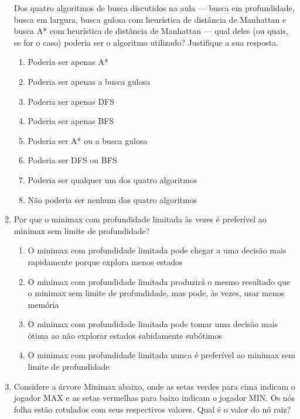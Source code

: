 \documentclass[a4paper,12pt]{article}
\begin{document}
\begin{enumerate}
Dos quatro algoritmos de busca discutidos na aula — busca em profundidade, busca em largura, busca gulosa com heurística de distância de Manhattan e busca A* com heurística de distância de Manhattan — qual deles (ou quais, se for o caso) poderia ser o algoritmo utilizado? Justifique a sua resposta.

\begin{enumerate}
    \item Poderia ser apenas A*
    \item Poderia ser apenas a busca gulosa
    \item Poderia ser apenas DFS
    \item Poderia ser apenas BFS
    \item Poderia ser A* ou a busca gulosa
    \item Poderia ser DFS ou BFS
    \item Poderia ser qualquer um dos quatro algoritmos
    \item Não poderia ser nenhum dos quatro algoritmos
\end{enumerate}


\item Por que o minimax com profundidade limitada às vezes é preferível ao minimax sem limite de profundidade?

\begin{enumerate}
    \item O minimax com profundidade limitada pode chegar a uma decisão mais rapidamente porque explora menos estados
    \item O minimax com profundidade limitada produzirá o mesmo resultado que o minimax sem limite de profundidade, mas pode, às vezes, usar menos memória
    \item O minimax com profundidade limitada pode tomar uma decisão mais ótima ao não explorar estados sabidamente subótimos
    \item O minimax com profundidade limitada nunca é preferível ao minimax sem limite de profundidade
\end{enumerate}

\item Considere a árvore Minimax abaixo, onde as setas verdes para cima indicam o jogador MAX e as setas vermelhas para baixo indicam o jogador MIN. Os nós folha estão rotulados com seus respectivos valores.
Qual é o valor do nó raiz?



\end{enumerate}
\end{document}
